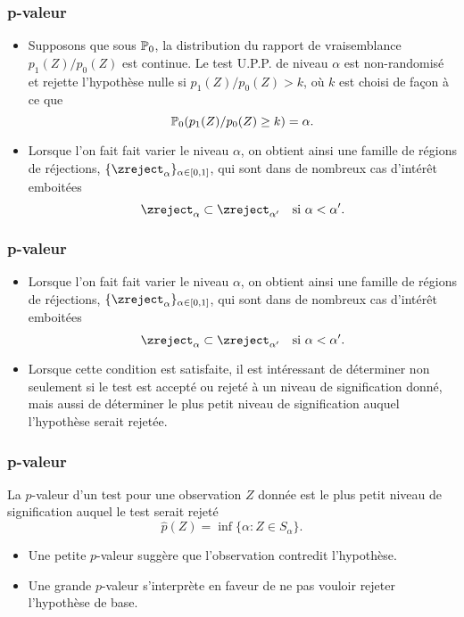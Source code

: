 \begin{frame}
\frametitle{p-valeur}
\begin{itemize}
\item Supposons que sous $\operatorname{{\mathbb P}}_0$, la distribution du rapport de vraisemblance $p_1(Z)/p_0(Z)$ est continue. Le test U.P.P. 
de niveau $\alpha$ est non-randomisé et rejette l'hypothèse nulle si $p_1(Z)/p_0(Z) > k$, où $k$ est choisi de façon à ce que 
\[
\operatorname{{\mathbb P}}_0 ( p_1(Z)/ p_0(Z) \geq k) = \alpha.
\]
\item Lorsque l'on fait fait varier le niveau $\alpha$, on obtient ainsi une famille de régions de réjections, $\{\zreject_\alpha\}_{\alpha \in \ccint{0,1}}$, qui sont dans de nombreux cas d'intérêt emboitées
    $$
    \zreject_\alpha \subset \zreject_{\alpha'} \quad \text{si $\alpha < \alpha'$}.
    $$
\end{itemize}
\end{frame}


\begin{frame}
\frametitle{p-valeur}
\begin{itemize}
\item Lorsque l'on fait fait varier le niveau $\alpha$, on obtient ainsi une famille de régions de réjections, $\{\zreject_\alpha\}_{\alpha \in \ccint{0,1}}$, qui sont dans de nombreux cas d'intérêt emboitées
    $$
    \zreject_\alpha \subset \zreject_{\alpha'} \quad \text{si $\alpha < \alpha'$}.
    $$
\item Lorsque cette condition est satisfaite, il est intéressant de déterminer non seulement si le test est accepté ou rejeté à un niveau de signification donné, mais aussi de déterminer \alert{le plus petit niveau de signification} auquel l'hypothèse serait rejetée.
\end{itemize}
\end{frame}

\begin{frame}
\frametitle{p-valeur}
\begin{definition}[p-valeur]
La $p$-valeur d'un test pour une observation $Z$ donnée est le plus petit niveau de signification auquel le test serait rejeté 
$$
\hat{p}(Z)= \inf\{ \alpha: Z \in S_\alpha\}.
$$
\end{definition}
\begin{itemize}
\item Une petite $p$-valeur suggère que l'observation contredit l'hypothèse. 
\item Une grande $p$-valeur s'interprète en faveur de ne pas vouloir rejeter l'hypothèse de base.
\end{itemize}
\end{frame}

